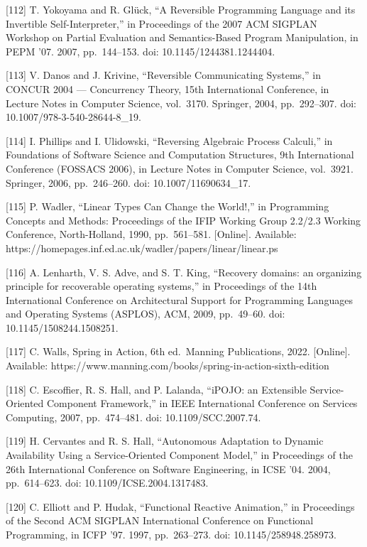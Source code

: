 {[}112{]} T. Yokoyama and R. Glück, ``A Reversible Programming Language and its
Invertible Self-Interpreter,'' in Proceedings of the 2007 ACM SIGPLAN Workshop on
Partial Evaluation and Semantics-Based Program Manipulation, in PEPM '07. 2007,
pp.~144--153. doi: 10.1145/1244381.1244404.

{[}113{]} V. Danos and J. Krivine, ``Reversible Communicating Systems,'' in CONCUR
2004 --- Concurrency Theory, 15th International Conference, in Lecture Notes in
Computer Science, vol.~3170. Springer, 2004, pp.~292--307. doi:
10.1007/978-3-540-28644-8\_19.

{[}114{]} I. Phillips and I. Ulidowski, ``Reversing Algebraic Process Calculi,'' in
Foundations of Software Science and Computation Structures, 9th International
Conference (FOSSACS 2006), in Lecture Notes in Computer Science, vol.~3921.
Springer, 2006, pp.~246--260. doi: 10.1007/11690634\_17.

{[}115{]} P. Wadler, ``Linear Types Can Change the World!,'' in Programming
Concepts and Methods: Proceedings of the IFIP Working Group 2.2/2.3 Working
Conference, North-Holland, 1990, pp.~561--581. {[}Online{]}. Available:
https://homepages.inf.ed.ac.uk/wadler/papers/linear/linear.ps

{[}116{]} A. Lenharth, V. S. Adve, and S. T. King, ``Recovery domains: an
organizing principle for recoverable operating systems,'' in Proceedings of the 14th
International Conference on Architectural Support for Programming Languages and
Operating Systems (ASPLOS), ACM, 2009, pp.~49--60. doi: 10.1145/1508244.1508251.

{[}117{]} C. Walls, Spring in Action, 6th ed.~Manning Publications, 2022. {[}Online{]}.
Available: https://www.manning.com/books/spring-in-action-sixth-edition

{[}118{]} C. Escoffier, R. S. Hall, and P. Lalanda, ``iPOJO: an Extensible
Service-Oriented Component Framework,'' in IEEE International Conference on
Services Computing, 2007, pp.~474--481. doi: 10.1109/SCC.2007.74.

{[}119{]} H. Cervantes and R. S. Hall, ``Autonomous Adaptation to Dynamic
Availability Using a Service-Oriented Component Model,'' in Proceedings of the 26th
International Conference on Software Engineering, in ICSE '04. 2004, pp.~614--623.
doi: 10.1109/ICSE.2004.1317483.

{[}120{]} C. Elliott and P. Hudak, ``Functional Reactive Animation,'' in Proceedings
of the Second ACM SIGPLAN International Conference on Functional Programming, in
ICFP '97. 1997, pp.~263--273. doi: 10.1145/258948.258973.

